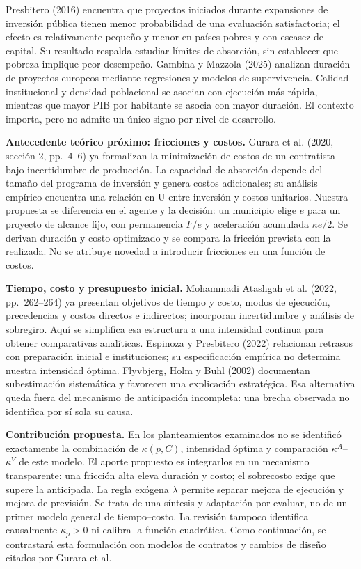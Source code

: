 \documentclass[11pt,a4paper]{article}
\begin{document}
Presbitero (2016) encuentra que proyectos iniciados durante expansiones de inversión pública tienen menor probabilidad de una evaluación satisfactoria; el efecto es relativamente pequeño y menor en países pobres y con escasez de capital. Su resultado respalda estudiar límites de absorción, sin establecer que pobreza implique peor desempeño. Gambina y Mazzola (2025) analizan duración de proyectos europeos mediante regresiones y modelos de supervivencia. Calidad institucional y densidad poblacional se asocian con ejecución más rápida, mientras que mayor PIB por habitante se asocia con mayor duración. El contexto importa, pero no admite un único signo por nivel de desarrollo.

\textbf{Antecedente teórico próximo: fricciones y costos.} Gurara et al. (2020, sección 2, pp.\ 4--6) ya formalizan la minimización de costos de un contratista bajo incertidumbre de producción. La capacidad de absorción depende del tamaño del programa de inversión y genera costos adicionales; su análisis empírico encuentra una relación en U entre inversión y costos unitarios. Nuestra propuesta se diferencia en el agente y la decisión: un municipio elige $e$ para un proyecto de alcance fijo, con permanencia $F/e$ y aceleración acumulada $\kappa e/2$. Se derivan duración y costo optimizado y se compara la fricción prevista con la realizada. No se atribuye novedad a introducir fricciones en una función de costos.

\textbf{Tiempo, costo y presupuesto inicial.} Mohammadi Atashgah et al. (2022, pp.\ 262--264) ya presentan objetivos de tiempo y costo, modos de ejecución, precedencias y costos directos e indirectos; incorporan incertidumbre y análisis de sobregiro. Aquí se simplifica esa estructura a una intensidad continua para obtener comparativas analíticas. Espinoza y Presbitero (2022) relacionan retrasos con preparación inicial e instituciones; su especificación empírica no determina nuestra intensidad óptima. Flyvbjerg, Holm y Buhl (2002) documentan subestimación sistemática y favorecen una explicación estratégica. Esa alternativa queda fuera del mecanismo de anticipación incompleta: una brecha observada no identifica por sí sola su causa.

\textbf{Contribución propuesta.} En los planteamientos examinados no se identificó exactamente la combinación de $\kappa(p,C)$, intensidad óptima y comparación $\kappa^A$--$\kappa^V$ de este modelo. El aporte propuesto es integrarlos en un mecanismo transparente: una fricción alta eleva duración y costo; el sobrecosto exige que supere la anticipada. La regla exógena $\lambda$ permite separar mejora de ejecución y mejora de previsión. Se trata de una síntesis y adaptación por evaluar, no de un primer modelo general de tiempo--costo. La revisión tampoco identifica causalmente $\kappa_p>0$ ni calibra la función cuadrática. Como continuación, se contrastará esta formulación con modelos de contratos y cambios de diseño citados por Gurara et al.
\newpage
\end{document}
